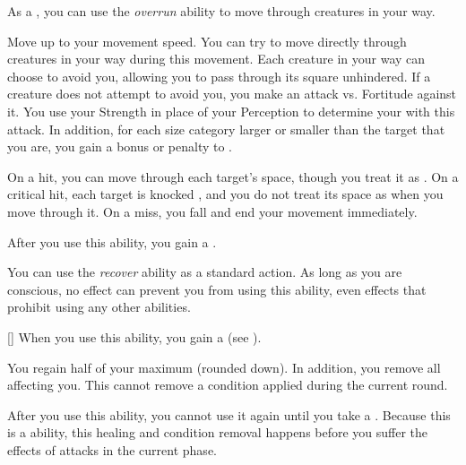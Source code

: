         As a , you can use the \textit{overrun} ability to move through creatures in your way.

        \begin{freeability}{}
            Move up to your movement speed.
            You can try to move directly through creatures in your way during this movement.
            Each creature in your way can choose to avoid you, allowing you to pass through its square unhindered.
            If a creature does not attempt to avoid you, you make an attack vs. Fortitude against it.
            You use your Strength in place of your Perception to determine your  with this attack.
            In addition, for each size category larger or smaller than the target that you are, you gain a  bonus or penalty to .

            On a hit, you can move through each target's space, though you treat it as .
            On a critical hit, each target is knocked , and you do not treat its space as  when you move through it.
            On a miss, you fall  and end your movement immediately.

            After you use this ability, you gain a .
        \end{freeability}

         You can use the \textit{recover} ability as a standard action.
        As long as you are conscious, no effect can prevent you from using this ability, even effects that prohibit using any other abilities.
        \begin{freeability}{}[]
            When you use this ability, you gain a  (see ).

            You regain half of your maximum  (rounded down).
            In addition, you remove all  affecting you.
            This cannot remove a condition applied during the current round.

            After you use this ability, you cannot use it again until you take a .
            Because this is a  ability, this healing and condition removal happens before you suffer the effects of attacks in the current phase.
        \end{freeability}

